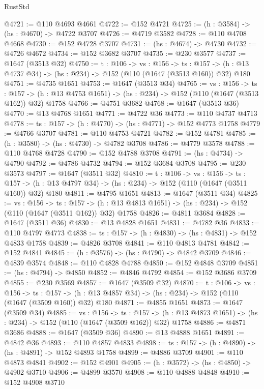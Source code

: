 \begin{lexlean}{RustStd}
\begin{coremodule}
@4721 := @110 @4693 @4661
@4722 := @152 @4721
@4725 := (h : @3584) -> (hs : @4670) -> @4722 @3707
@4726 := @4719 @3582
@4728 := @110 @4708 @4668
@4730 := @152 @4728 @3707
@4731 := (hs : @4674) -> @4730
@4732 := @4726 @4672
@4734 := @152 @3682 @3707
@4735 := @230 @3577
@4737 := @1647 (@3513 @32)
@4750 := {t : @106} ->
  {vs : @156} ->
  {ts : @157} -> (h : @13 @4737 @34) -> (hs : @234) -> @152 (@110 (@1647 (@3513 @160)) @32) @180
@4751 := @4735 @1651
@4753 := @1647 (@3513 @34)
@4765 := {vs : @156} ->
  {ts : @157} -> (h : @13 @4753 @1651) -> (hs : @234) -> @152 (@110 (@1647 (@3513 @162)) @32) @1758
@4766 := @4751 @3682
@4768 := @1647 (@3513 @36)
@4770 := @13 @4768 @1651
@4771 := @4722 @36
@4773 := @110 @4737 @4713
@4778 := {ts : @157} -> (h : @4770) -> (hs : @4771) -> @152 @4773 @1758
@4779 := @4766 @3707
@4781 := @110 @4753 @4721
@4782 := @152 @4781
@4785 := (h : @3580) -> (hs : @4730) -> @4782 @3708
@4786 := @4779 @3578
@4788 := @110 @4768 @4728
@4790 := @152 @4788 @3708
@4791 := (hs : @4734) -> @4790
@4792 := @4786 @4732
@4794 := @152 @3684 @3708
@4795 := @230 @3573
@4797 := @1647 (@3511 @32)
@4810 := {t : @106} ->
  {vs : @156} ->
  {ts : @157} -> (h : @13 @4797 @34) -> (hs : @234) -> @152 (@110 (@1647 (@3511 @160)) @32) @180
@4811 := @4795 @1651
@4813 := @1647 (@3511 @34)
@4825 := {vs : @156} ->
  {ts : @157} -> (h : @13 @4813 @1651) -> (hs : @234) -> @152 (@110 (@1647 (@3511 @162)) @32) @1758
@4826 := @4811 @3684
@4828 := @1647 (@3511 @36)
@4830 := @13 @4828 @1651
@4831 := @4782 @36
@4833 := @110 @4797 @4773
@4838 := {ts : @157} -> (h : @4830) -> (hs : @4831) -> @152 @4833 @1758
@4839 := @4826 @3708
@4841 := @110 @4813 @4781
@4842 := @152 @4841
@4845 := (h : @3576) -> (hs : @4790) -> @4842 @3709
@4846 := @4839 @3574
@4848 := @110 @4828 @4788
@4850 := @152 @4848 @3709
@4851 := (hs : @4794) -> @4850
@4852 := @4846 @4792
@4854 := @152 @3686 @3709
@4855 := @230 @3569
@4857 := @1647 (@3509 @32)
@4870 := {t : @106} ->
  {vs : @156} ->
  {ts : @157} -> (h : @13 @4857 @34) -> (hs : @234) -> @152 (@110 (@1647 (@3509 @160)) @32) @180
@4871 := @4855 @1651
@4873 := @1647 (@3509 @34)
@4885 := {vs : @156} ->
  {ts : @157} -> (h : @13 @4873 @1651) -> (hs : @234) -> @152 (@110 (@1647 (@3509 @162)) @32) @1758
@4886 := @4871 @3686
@4888 := @1647 (@3509 @36)
@4890 := @13 @4888 @1651
@4891 := @4842 @36
@4893 := @110 @4857 @4833
@4898 := {ts : @157} -> (h : @4890) -> (hs : @4891) -> @152 @4893 @1758
@4899 := @4886 @3709
@4901 := @110 @4873 @4841
@4902 := @152 @4901
@4905 := (h : @3572) -> (hs : @4850) -> @4902 @3710
@4906 := @4899 @3570
@4908 := @110 @4888 @4848
@4910 := @152 @4908 @3710

\end{coremodule}
\end{lexlean}
